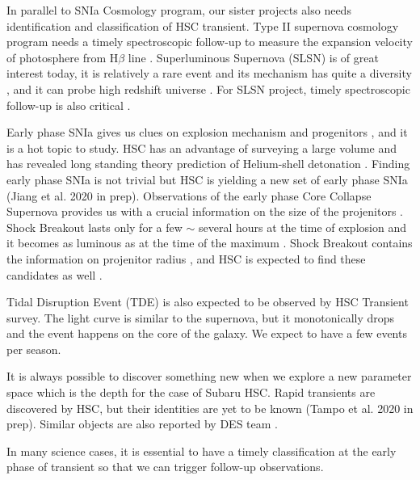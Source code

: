 \documentclass[useamsfonts]{pasj01}
\begin{document}
In parallel to SNIa Cosmology program, our sister projects also needs identification and classification of HSC transient.   
Type II supernova cosmology program needs a timely spectroscopic follow-up to measure the expansion velocity of photosphere from H$\beta$ line \citep{dejaeger17a}.
Superluminous Supernova (SLSN) is of great interest today, it is relatively a rare event\citep{quimby11a} and its mechanism has quite a diversity \citep{galyam12a,moriya12a}, and it can probe high redshift universe \citep{cooke12a}.    
For SLSN project, timely spectroscopic follow-up is also critical \citep{moriya19a,curtin19a}.

Early phase SNIa gives us clues on explosion mechanism \citep{maeda18a} and progenitors \citep{cao15a}, and it is a hot topic to study.
HSC has an advantage of surveying a large volume and has revealed long standing theory prediction of Helium-shell detonation \citep{jiang18a}.
Finding early phase SNIa is not trivial but HSC is yielding a new set of early phase SNIa (Jiang et al. 2020 in prep).
Observations of the early phase Core Collapse Supernova provides us with a crucial information on the size of the projenitors \citep{thompson03a,chevalier11a}.  Shock Breakout lasts only for a few $\sim$ several hours at the time of explosion and it becomes as luminous as at the time of the maximum \citep{gezari08a}. 
Shock Breakout contains the information on projenitor radius \citep{nakar10a}, and HSC is expected to find these candidates as well \citep{tominaga11a}.

Tidal Disruption Event (TDE) is also expected to be observed by HSC Transient survey.  The light curve is similar to
the supernova, but it monotonically drops and the event happens on the core of the galaxy.  We expect to have a few
events per season.

It is always possible to discover something new when we explore a new parameter space which is the depth for the case
of Subaru HSC.   Rapid transients are discovered by HSC, but their identities are yet to be known (Tampo et al.  2020 in prep).  Similar objects are also reported by DES team \citep{pursianinen18a}.

In many science cases, it is essential to have a timely classification at the early phase of transient so that we can trigger follow-up observations.

\end{document}
